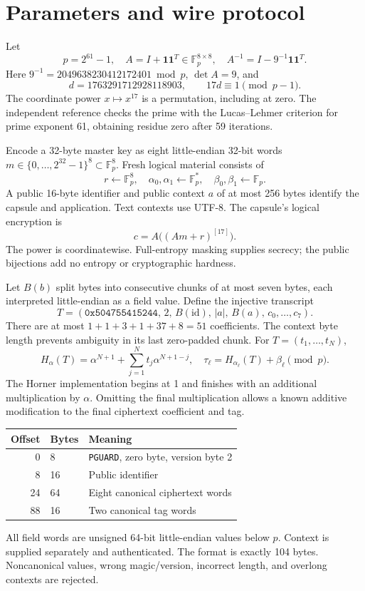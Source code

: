 \documentclass[11pt]{article}
\newcommand{\F}{\mathbb F_p}
\newcommand{\one}{\mathbf1}
\begin{document}
\section{Parameters and wire protocol}
Let
\[
p=2^{61}-1,\quad
A=I+\one\one^T\in\F^{8\times8},\quad
A^{-1}=I-9^{-1}\one\one^T.
\]
Here $9^{-1}=2049638230412172401\bmod p$, $\det A=9$, and
\[
d=1763291712928118903,\qquad 17d\equiv1\pmod{p-1}.
\]
The coordinate power $x\mapsto x^{17}$ is a permutation, including at zero.
The independent reference checks the prime with the Lucas--Lehmer criterion
for prime exponent 61, obtaining residue zero after 59 iterations.

Encode a 32-byte master key as eight little-endian 32-bit words
$m\in\{0,\ldots,2^{32}-1\}^8\subset\F^8$.
Fresh logical material consists of
\[
r\gets\F^8,\quad
\alpha_0,\alpha_1\gets\F^\ast,\quad
\beta_0,\beta_1\gets\F.
\]
A public 16-byte identifier and public context $a$ of at most 256 bytes
identify the capsule and application. Text contexts use UTF-8.
The capsule's logical encryption is
\begin{equation}
 c=A\bigl((Am+r)^{[17]}\bigr).
 \label{eq:capsule}
\end{equation}
The power is coordinatewise. Full-entropy masking supplies secrecy;
the public bijections add no entropy or cryptographic hardness.

Let $B(b)$ split bytes into consecutive chunks of at most seven bytes,
each interpreted little-endian as a field value. Define the injective
transcript
\[
T=(\mathtt{0x504755415244},\,2,\,B(\mathrm{id}),\,|a|,\,B(a),\,
c_0,\ldots,c_7).
\]
There are at most $1+1+3+1+37+8=51$ coefficients. The context byte length
prevents ambiguity in its last zero-padded chunk. For $T=(t_1,\ldots,t_N)$,
\begin{equation}
H_\alpha(T)=\alpha^{N+1}+\sum_{j=1}^{N}t_j\alpha^{N+1-j},\quad
\tau_\ell=H_{\alpha_\ell}(T)+\beta_\ell \pmod p.
\label{eq:tag}
\end{equation}
The Horner implementation begins at 1 and finishes with an additional
multiplication by $\alpha$. Omitting the final multiplication allows a
known additive modification to the final ciphertext coefficient and tag.

\begin{center}
\begin{tabular}{rll}
\toprule
Offset & Bytes & Meaning\\
\midrule
0 & 8 & \texttt{PGUARD}, zero byte, version byte 2\\
8 & 16 & Public identifier\\
24 & 64 & Eight canonical ciphertext words\\
88 & 16 & Two canonical tag words\\
\bottomrule
\end{tabular}
\end{center}
All field words are unsigned 64-bit little-endian values below $p$.
Context is supplied separately and authenticated. The format is exactly
104 bytes. Noncanonical values, wrong magic/version, incorrect length,
and overlong contexts are rejected.
\end{document}
